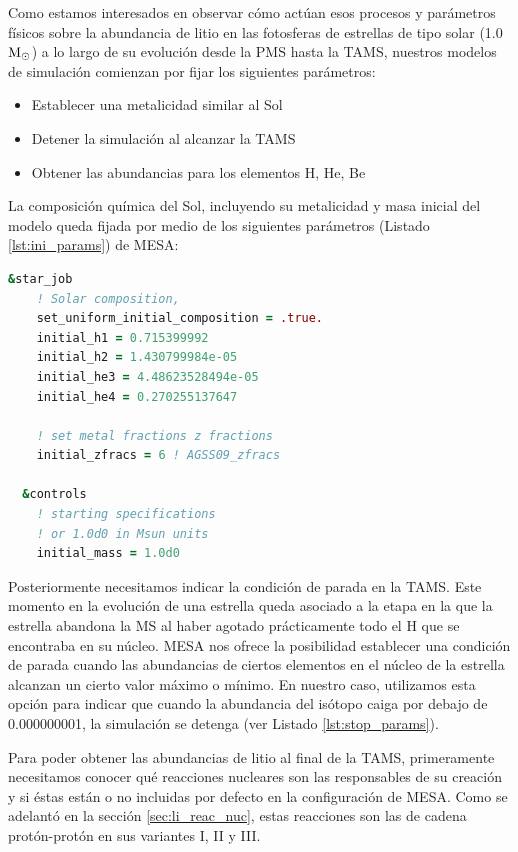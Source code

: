 Como estamos interesados en observar cómo actúan esos procesos y parámetros físicos sobre la abundancia de litio en las fotosferas de estrellas de tipo solar (1.0 $\mathrm{M}_\odot$) a lo largo de su evolución desde la PMS hasta la TAMS, nuestros modelos de simulación comienzan por fijar los siguientes parámetros:

\begin{itemize}
    \item Establecer una metalicidad similar al Sol
    \item Detener la simulación al alcanzar la TAMS
    \item Obtener las abundancias para los elementos H, He, Be
\end{itemize}

La composición química del Sol, incluyendo su metalicidad y masa inicial del modelo queda fijada por medio de los siguientes parámetros (Listado \ref{lst:ini_params}) de MESA:

\begin{lstlisting}[language=Fortran, float, caption={Parametrización de la metalicidad y masa inicial de la estrella}, label={lst:ini_params}]
  &star_job
    ! Solar composition, 
    set_uniform_initial_composition = .true.
    initial_h1 = 0.715399992
    initial_h2 = 1.430799984e-05
    initial_he3 = 4.48623528494e-05
    initial_he4 = 0.270255137647

    ! set metal fractions z fractions
    initial_zfracs = 6 ! AGSS09_zfracs

  &controls
    ! starting specifications
    ! or 1.0d0 in Msun units
    initial_mass = 1.0d0 
\end{lstlisting}

Posteriormente necesitamos indicar la condición de parada en la TAMS. Este momento en la evolución de una estrella queda asociado a la etapa en la que la estrella abandona la MS al haber agotado prácticamente todo el H que se encontraba en su núcleo. MESA nos ofrece la posibilidad establecer una condición de parada cuando las abundancias de ciertos elementos en el núcleo de la estrella alcanzan un cierto valor máximo o mínimo. En nuestro caso, utilizamos esta opción para indicar que cuando la abundancia del isótopo  caiga por debajo de 0.000000001, la simulación se detenga (ver Listado \ref{lst:stop_params}).\par

Para poder obtener las abundancias de litio al final de la TAMS, primeramente necesitamos conocer qué reacciones nucleares son las responsables de su creación y si éstas están o no incluidas por defecto en la configuración de MESA. Como se adelantó en la sección \ref{sec:li_reac_nuc}, estas reacciones son las de cadena protón-protón en sus variantes I, II y III.\par

